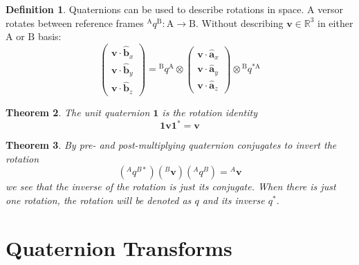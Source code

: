 \documentclass{amsart}
\newtheorem{theorem}{Theorem}[section]
\theoremstyle{definition}
\newtheorem{definition}[theorem]{Definition}
\theoremstyle{remark}
\numberwithin{equation}{section}
\begin{document}
\begin{definition}
  Quaternions can be used to describe rotations in space. A versor rotates between reference frames ${^\mathrm{A}q^\mathrm{B}}:\mathrm{A}\to\mathrm{B}$. Without describing $\mathbf{v}\in\mathbb{R}^3$ in either $\mathrm{A}$ or $\mathrm{B}$ basis:
  \begin{equation}
    \begin{pmatrix}
      \mathbf{v} \cdot \hat{\mathbf{b}}_x \\
      \mathbf{v} \cdot \hat{\mathbf{b}}_y \\
      \mathbf{v} \cdot \hat{\mathbf{b}}_z
    \end{pmatrix} = {^\mathrm{B}q^\mathrm{A}} \otimes 
    \begin{pmatrix}
      \mathbf{v} \cdot \hat{\mathbf{a}}_x \\
      \mathbf{v} \cdot \hat{\mathbf{a}}_y \\
      \mathbf{v} \cdot \hat{\mathbf{a}}_z
    \end{pmatrix} \otimes {^\mathrm{B}q^{*\mathrm{A}}}
  \end{equation}
\end{definition}

\begin{theorem}
  The \emph{unit quaternion} $\mathbf{1}$ is the rotation identity
  \begin{equation}
   \mathbf{1} \mathbf{v} \mathbf{1}^* = \mathbf{v}  
  \end{equation} 
\end{theorem}

\begin{theorem}
  By pre- and post-multiplying quaternion conjugates to invert the rotation
  \begin{equation}
    \left({^Aq^{B*}}\right)\left({^B\mathbf{v}}\right)\left({^Aq^B}\right)={^A\mathbf{v}}
  \end{equation}
  we see that the inverse of the rotation is just its conjugate. When there is just one rotation, the rotation will be denoted as $q$ and its inverse $q^*$.
\end{theorem}

\section{Quaternion Transforms}
\end{document}
